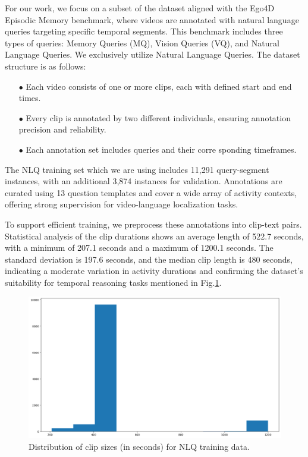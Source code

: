\documentclass[10pt,twocolumn,letterpaper]{article}
\begin{document}
For our work, we focus on a subset of the dataset aligned with the Ego4D Episodic Memory benchmark, where videos are annotated with natural language queries targeting specific temporal segments. This benchmark includes three types of queries: Memory Queries (MQ), Vision Queries (VQ), and Natural Language Queries. We exclusively utilize Natural Language Queries. The dataset structure is as follows:
	\begin{itemize}
		\item[$\bullet$] Each video consists of one or more clips, each with
		defined start and end times.
		\item[$\bullet$] Every clip is annotated by two different individuals,
		ensuring annotation precision and reliability.
		\item[$\bullet$] Each annotation set includes queries and their corre
		sponding timeframes.
	\end{itemize}
	
The NLQ training set which we are using includes 11,291 query-segment instances, with an additional 3,874 instances for validation. Annotations are curated using 13 question templates and cover a wide array of activity contexts, offering strong supervision for video-language localization tasks.
	
To support efficient training, we preprocess these annotations into clip-text pairs. Statistical analysis of the clip durations shows an average length of 522.7 seconds, with a minimum of 207.1 seconds and a maximum of 1200.1 seconds. The standard deviation is 197.6 seconds, and the median clip length is 480 seconds, indicating a moderate variation in activity durations and confirming the dataset’s suitability for temporal reasoning tasks mentioned in Fig.\ref{fig:clip_dist}.
	
	\begin{figure}[htbp]
		\centering
		\includegraphics[width=0.8\linewidth]{clip_size_distribution.png}
		\caption{Distribution of clip sizes (in seconds) for NLQ training data.}
		\label{fig:clip_dist}
	\end{figure}
	
\end{document}
